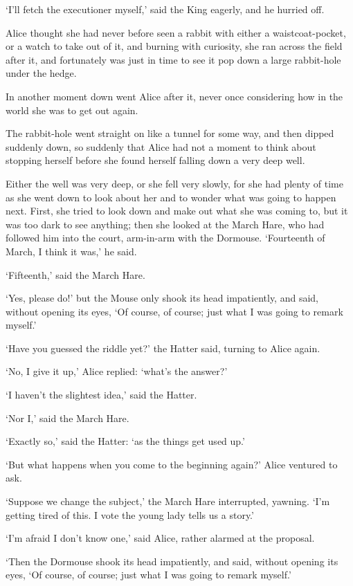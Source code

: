 \documentclass[statementpaper,twoside,openany]{memoir}
\begin{document}
`I'll fetch the executioner myself,' said the King eagerly, and he hurried off.

Alice thought she had never before seen a rabbit with either a waistcoat-pocket, or a watch to take out of it, and burning with curiosity, she ran across the field after it, and fortunately was just in time to see it pop down a large rabbit-hole under the hedge.

In another moment down went Alice after it, never once considering how in the world she was to get out again.

The rabbit-hole went straight on like a tunnel for some way, and then dipped suddenly down, so suddenly that Alice had not a moment to think about stopping herself before she found herself falling down a very deep well.

Either the well was very deep, or she fell very slowly, for she had plenty of time as she went down to look about her and to wonder what was going to happen next. First, she tried to look down and make out what she was coming to, but it was too dark to see anything; then she looked at the March Hare, who had followed him into the court, arm-in-arm with the Dormouse. `Fourteenth of March, I think it was,' he said.

`Fifteenth,' said the March Hare.

`Yes, please do!' but the Mouse only shook its head impatiently, and said, without opening its eyes, `Of course, of course; just what I was going to remark myself.'

`Have you guessed the riddle yet?' the Hatter said, turning to Alice again.

`No, I give it up,' Alice replied: `what's the answer?'

`I haven't the slightest idea,' said the Hatter.

`Nor I,' said the March Hare.

`Exactly so,' said the Hatter: `as the things get used up.'

`But what happens when you come to the beginning again?' Alice ventured to ask.

`Suppose we change the subject,' the March Hare interrupted, yawning. `I'm getting tired of this. I vote the young lady tells us a story.'

`I'm afraid I don't know one,' said Alice, rather alarmed at the proposal.

`Then the Dormouse shook its head impatiently, and said, without opening its eyes, `Of course, of course; just what I was going to remark myself.'
\end{document}
